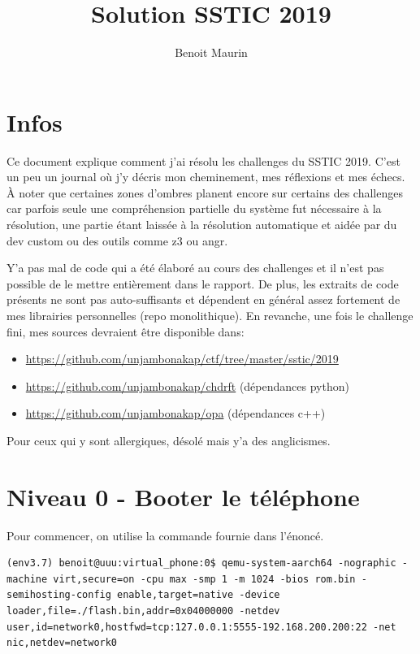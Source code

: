 \documentclass[14pt]{article}
\title{\vspace{-1cm}Solution SSTIC 2019 \vspace{-2ex}}
\author{Benoit Maurin\vspace{-2ex}}
\theoremstyle{definition}
\begin{document}
\date{}

\maketitle

\vspace{-1cm}
\section*{Infos}

Ce document explique comment j'ai résolu les challenges du SSTIC 2019. C'est un peu un journal où j'y décris mon cheminement, mes réflexions et mes échecs.
À noter que certaines zones d'ombres planent encore sur certains des challenges car parfois seule une compréhension partielle du système fut nécessaire à la résolution, une partie étant laissée à la résolution automatique et aidée par du dev custom ou des outils comme z3 ou angr.


Y'a pas mal de code qui a été élaboré au cours des challenges et il n'est pas possible de le mettre entièrement dans le rapport. De plus, les extraits de code présents ne sont pas auto-suffisants et dépendent en général assez fortement de mes librairies personnelles (repo monolithique). En revanche, une fois le challenge fini, mes sources devraient être disponible dans:
\begin{itemize}
  \item \url{https://github.com/unjambonakap/ctf/tree/master/sstic/2019}
  \item \url{https://github.com/unjambonakap/chdrft} (dépendances python)
  \item \url{https://github.com/unjambonakap/opa} (dépendances c++)
\end{itemize}

Pour ceux qui y sont allergiques, désolé mais y'a des anglicismes.


\tableofcontents
\pagebreak



\section{Niveau 0 - Booter le téléphone}

Pour commencer, on utilise la commande fournie dans l'énoncé.
\begin{verbatim}
(env3.7) benoit@uuu:virtual_phone:0$ qemu-system-aarch64 -nographic -machine virt,secure=on -cpu max -smp 1 -m 1024 -bios rom.bin -semihosting-config enable,target=native -device loader,file=./flash.bin,addr=0x04000000 -netdev user,id=network0,hostfwd=tcp:127.0.0.1:5555-192.168.200.200:22 -net nic,netdev=network0
\end{verbatim}
\end{document}
